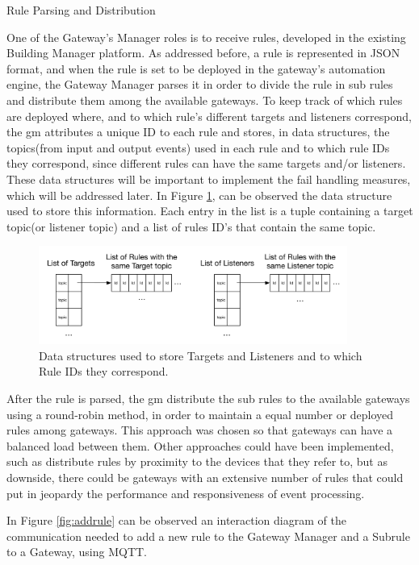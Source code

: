 \begin{Paragraph}{Rule Parsing and Distribution}
	
One of the Gateway's Manager roles is to receive rules, developed in the existing Building Manager platform. As addressed before, a rule is represented in JSON format, and when the rule is set to be deployed in the gateway's automation engine, the Gateway Manager parses it in order to divide the rule in sub rules and distribute them among the available gateways. To keep track of which rules are deployed where, and to which rule's different targets and listeners correspond, the \ac{gm} attributes a unique ID to each rule and stores, in data structures, the topics(from input and output events) used in each rule and to which rule IDs they correspond, since different rules can have the same targets and/or listeners. These data structures will be important to implement the fail handling measures, which will be addressed later. In Figure \ref{fig:parser_struct}, can be observed the data structure used to store this information. Each entry in the list is a tuple containing a target topic(or listener topic) and a list of rules ID's that contain the same topic.

\begin{figure}[H]
	\centering
	\includegraphics[width=0.9\textwidth]{figures/parser_struct.png}
	\caption{Data structures used to store Targets and Listeners and to which Rule IDs they correspond.}
	\label{fig:parser_struct}
\end{figure}

After the rule is parsed, the \ac{gm} distribute the sub rules to the available gateways using a round-robin method, in order to maintain a equal number or deployed rules among gateways. This approach was chosen so that gateways can have a balanced load between them. Other approaches could have been implemented, such as distribute rules by proximity to the devices that they refer to, but as downside, there could be gateways with an extensive number of rules that could put in jeopardy the performance and responsiveness of event processing. 

In Figure \ref{fig:addrule} can be observed an interaction diagram of the communication needed to add a new rule to the Gateway Manager and a Subrule to a Gateway, using MQTT.


\end{Paragraph}
